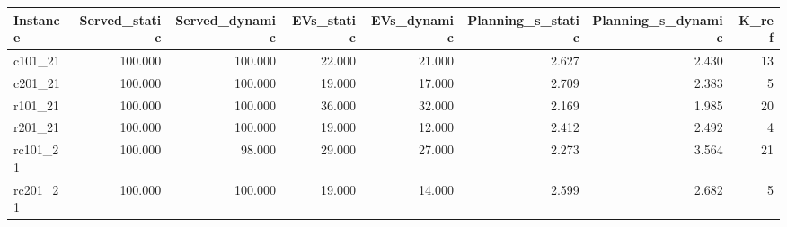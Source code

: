 \begin{tabular}{lrrrrrrr}
\toprule
Instance & Served\_static & Served\_dynamic & EVs\_static & EVs\_dynamic & Planning\_s\_static & Planning\_s\_dynamic & K\_ref \\
\midrule
c101\_21 & 100.000 & 100.000 & 22.000 & 21.000 & 2.627 & 2.430 & 13 \\
c201\_21 & 100.000 & 100.000 & 19.000 & 17.000 & 2.709 & 2.383 & 5 \\
r101\_21 & 100.000 & 100.000 & 36.000 & 32.000 & 2.169 & 1.985 & 20 \\
r201\_21 & 100.000 & 100.000 & 19.000 & 12.000 & 2.412 & 2.492 & 4 \\
rc101\_21 & 100.000 & 98.000 & 29.000 & 27.000 & 2.273 & 3.564 & 21 \\
rc201\_21 & 100.000 & 100.000 & 19.000 & 14.000 & 2.599 & 2.682 & 5 \\
\bottomrule
\end{tabular}
